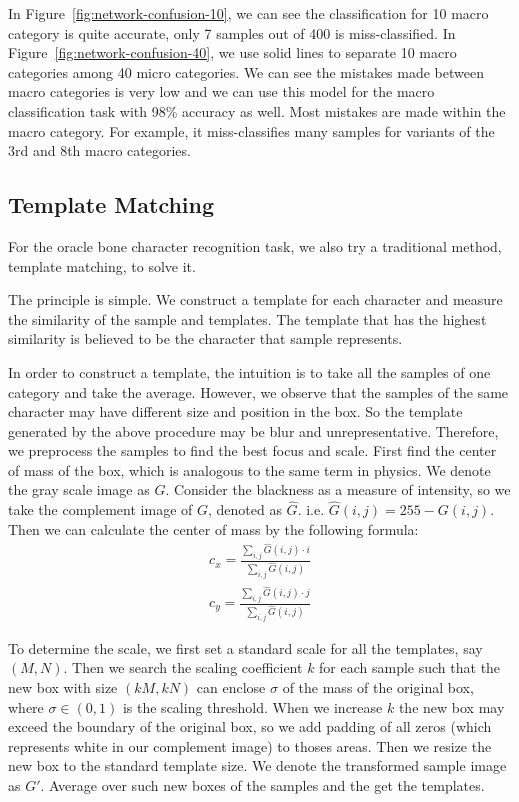 \documentclass[journal]{IEEEtran}
\begin{document}
In Figure~\ref{fig:network-confusion-10}, we can see the classification for 10 macro category is quite accurate, only 7 samples out of 400 is miss-classified.
In Figure~\ref{fig:network-confusion-40}, we use solid lines to separate 10 macro categories among 40 micro categories.
We can see the mistakes made between macro categories is very low and we can use this model for the macro classification task with 98\% accuracy as well.
Most mistakes are made within the macro category.
For example, it miss-classifies many samples for variants of the 3rd and 8th macro categories.

\subsection{Template Matching}
For the oracle bone character recognition task, we also try a traditional method, template matching, to solve it.

The principle is simple. We construct a template for each character and measure the similarity of the sample and templates. The template that has the highest similarity is believed to be the character that sample represents.

In order to construct a template, the intuition is to take all the samples of one category and take the average. However, we observe that the samples of the same character may have different size and position in the box. So the template generated by the above procedure may be blur and unrepresentative. Therefore, we preprocess the samples to find the best focus and scale. First find the center of mass of the box, which is analogous to the same term in physics. We denote the gray scale image as $G$. Consider the blackness as a measure of intensity, so we take the complement image of $G$, denoted as $\hat{G}$. i.e. $\hat{G}(i,j)=255-G(i,j)$. Then we can calculate the center of mass by the following formula:
\begin{align*}
	c_x=\frac{\sum_{i,j}\hat{G}(i,j)\cdot i}{\sum_{i,j} \hat{G}(i,j)} \\
	c_y=\frac{\sum_{i,j}\hat{G}(i,j)\cdot j}{\sum_{i,j} \hat{G}(i,j)}
\end{align*}

To determine the scale, we first set a standard scale for all the templates, say $(M,N)$. Then we search the scaling coefficient $k$ for each sample such that the new box with size $(kM,kN)$ can enclose $\sigma$ of the mass of the original box, where $\sigma\in (0,1)$ is the scaling threshold. When we increase $k$ the new box may exceed the boundary of the original box, so we add padding of all zeros (which represents white in our complement image) to thoses areas. Then we resize the new box to the standard template size. We denote the transformed sample image as $G'$. Average over such new boxes of the samples and the get the templates.
\end{document}
